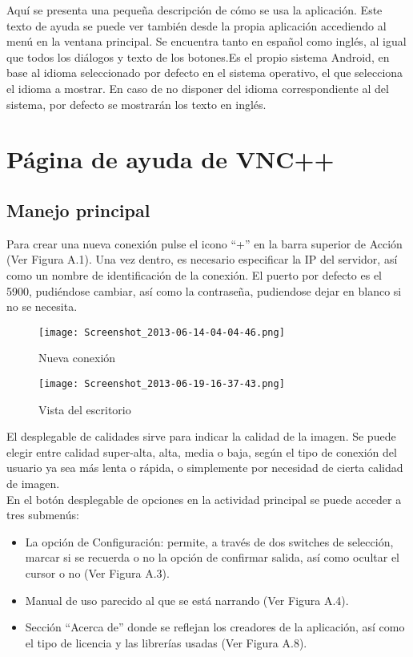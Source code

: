 Aquí se presenta una pequeña descripción de cómo se usa la aplicación. Este texto de ayuda se puede ver también desde la propia aplicación accediendo al menú en la ventana principal. Se encuentra tanto en español como inglés, al igual que todos los diálogos y texto de los botones.Es el propio sistema Android, en base al idioma seleccionado por defecto en el sistema operativo, el que selecciona el idioma a mostrar. En caso de no disponer del idioma correspondiente al del sistema, por defecto se mostrarán los texto en inglés.
\section{Página de ayuda de VNC++}
\subsection{Manejo principal}
Para crear una nueva conexión pulse el icono ``+'' en la barra superior de Acción (Ver Figura A.1). Una vez dentro, es necesario especificar la IP del servidor, así como un nombre de identificación de la conexión. El puerto por defecto es el 5900, pudiéndose cambiar, así como la contraseña, pudiendose dejar en blanco si no se necesita.
\begin{figure}[h]
\hfill
\begin{minipage}[t]{.45\textwidth}
\begin{center}
\texttt{[image: Screenshot\_2013-06-14-04-04-46.png]}
\caption{Nueva conexión}
\end{center}
\end{minipage}
\hfill
\begin{minipage}[t]{.45\textwidth}
\begin{center}
\texttt{[image: Screenshot\_2013-06-19-16-37-43.png]}
\caption{Vista del escritorio}
\end{center}
\end{minipage}
\hfill
\end{figure}
\newpage

El desplegable de calidades sirve para indicar la calidad de la imagen. Se puede elegir entre calidad super-alta, alta, media o baja, según el tipo de conexión del usuario ya sea más lenta o rápida, o simplemente por necesidad de cierta calidad de imagen.\\

En el botón desplegable de opciones en la actividad principal se puede acceder a tres submenús:
\begin{itemize}
\item La opción de Configuración: permite, a través de dos switches de selección, marcar si se recuerda o no la opción de confirmar salida, así como ocultar el cursor o no (Ver Figura A.3).
\item Manual de uso parecido al que se está narrando (Ver Figura A.4).
\item Sección “Acerca de” donde se reflejan los creadores de la aplicación, así como el tipo de licencia y las librerías usadas (Ver Figura A.8).
\end{itemize}

